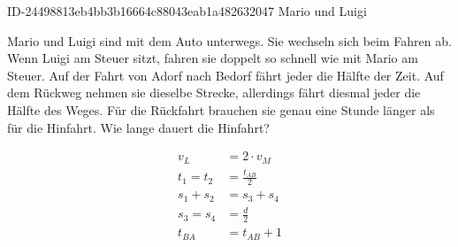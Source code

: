 \begin{exercise}
      {ID-24498813eb4bb3b16664c88043eab1a482632047}
      {Mario und Luigi}
  \ifproblem\problem\par
    Mario und Luigi sind mit dem Auto unterwegs. Sie wechseln sich beim
    Fahren ab. Wenn Luigi am Steuer sitzt, fahren sie doppelt so schnell wie
    mit Mario am Steuer. Auf der Fahrt von Adorf nach Bedorf fährt jeder die
    Hälfte der Zeit. Auf dem Rückweg nehmen sie dieselbe Strecke, allerdings
    fährt diesmal jeder die Hälfte des Weges. Für die Rückfahrt brauchen sie
    genau eine Stunde länger als für die Hinfahrt. Wie lange dauert die
    Hinfahrt?
  \fi
  \ifoutline\outline\par
    \begin{minipage}{0.49\textwidth}
      \centering
    \end{minipage}%
    \hfill
    \begin{minipage}{0.49\textwidth}
      \begin{equation*}
        \begin{split}
        v_{L}&=2\cdot v_{M} \\
        t_{1}=t_{2}&=\frac{t_{AB}}{2} \\
        s_{1}+s_{2}&=s_{3}+s_{4} \\
        s_{3}=s_{4}&=\frac{d}{2} \\
        t_{B\!A}&=t_{AB}+1
        \end{split}

\end{equation*}
\end{minipage}
\end{exercise}
